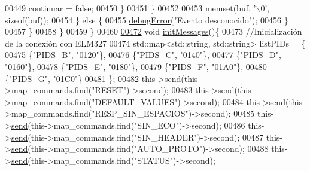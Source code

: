 \begin{DoxyCode}
{{{{{{{{{{{{{00449                             continuar = \textcolor{keyword}{false};
00450                         \}
00451                     \}
00452 
00453                     memset(buf, \textcolor{charliteral}{'\(\backslash\)0'}, \textcolor{keyword}{sizeof}(buf));
00454                 \} \textcolor{keywordflow}{else} \{
00455                     \hyperlink{debug_8hpp_a06cd512b8b15b6da31a5a557445f7027}{debugError}(\textcolor{stringliteral}{"Evento desconocido"});
00456                 \}
00457             \}
00458         \}
00459     \}
00460 
\hyperlink{classObd_a5091314ed8068800cce40e7a74a3731e}{00472}     \textcolor{keywordtype}{void} \hyperlink{classObd_a5091314ed8068800cce40e7a74a3731e}{initMessages}()\{
00473         \textcolor{comment}{//Inicialización de la conexión con ELM327}
00474         std::map<std::string, std::string> listPIDs = \{
00475             \{\textcolor{stringliteral}{"PIDS\_B"}, \textcolor{stringliteral}{"0120"}\},
00476             \{\textcolor{stringliteral}{"PIDS\_C"}, \textcolor{stringliteral}{"0140"}\},
00477             \{\textcolor{stringliteral}{"PIDS\_D"}, \textcolor{stringliteral}{"0160"}\},
00478             \{\textcolor{stringliteral}{"PIDS\_E"}, \textcolor{stringliteral}{"0180"}\},
00479             \{\textcolor{stringliteral}{"PIDS\_F"}, \textcolor{stringliteral}{"01A0"}\},
00480             \{\textcolor{stringliteral}{"PIDS\_G"}, \textcolor{stringliteral}{"01C0"}\}
00481         \};
00482         this->\hyperlink{classObd_a453591bc9a280e8d44d82025ce8590e9}{send}(this->map\_commands.find(\textcolor{stringliteral}{"RESET"})->second);
00483         this->\hyperlink{classObd_a453591bc9a280e8d44d82025ce8590e9}{send}(this->map\_commands.find(\textcolor{stringliteral}{"DEFAULT\_VALUES"})->second);
00484         this->\hyperlink{classObd_a453591bc9a280e8d44d82025ce8590e9}{send}(this->map\_commands.find(\textcolor{stringliteral}{"RESP\_SIN\_ESPACIOS"})->second);                   
00485         this->\hyperlink{classObd_a453591bc9a280e8d44d82025ce8590e9}{send}(this->map\_commands.find(\textcolor{stringliteral}{"SIN\_ECO"})->second);
00486         this->\hyperlink{classObd_a453591bc9a280e8d44d82025ce8590e9}{send}(this->map\_commands.find(\textcolor{stringliteral}{"SIN\_HEADER"})->second);                  
00487         this->\hyperlink{classObd_a453591bc9a280e8d44d82025ce8590e9}{send}(this->map\_commands.find(\textcolor{stringliteral}{"AUTO\_PROTO"})->second);
00488         this->\hyperlink{classObd_a453591bc9a280e8d44d82025ce8590e9}{send}(this->map\_commands.find(\textcolor{stringliteral}{"STATUS"})->second);
}}}}}}}}}}}}}
\end{DoxyCode}
